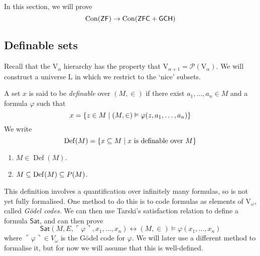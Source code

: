 In this section, we will prove
\[ \operatorname{Con}(\mathsf{ZF}) \to \operatorname{Con}(\mathsf{ZFC} + \mathsf{GCH}) \]

\subsection{Definable sets}
Recall that the \( \mathrm{V}_\alpha \) hierarchy has the property that \( \mathrm{V}_{\alpha + 1} = \mathcal P(\mathrm{V}_\alpha) \).
We will construct a universe \( \mathrm{L} \) in which we restrict to the `nice' subsets.
\begin{definition}
    A set \( x \) is said to be \emph{definable} over \( (M, \in) \) if there exist \( a_1, \dots, a_n \in M \) and a formula \( \varphi \) such that
    \[ x = \qty{z \in M \mid (M, \in) \vDash \varphi(z, a_1, \dots, a_n)} \]
    We write
    \[ \operatorname{Def}(M) = \qty{x \subseteq M \mid x \text{ is definable over } M} \]
\end{definition}
\begin{remark}
    \begin{enumerate}
        \item \( M \in \operatorname{Def}(M) \).
        \item \( M \subseteq \operatorname{Def}(M) \subseteq \mathcal \mathcal P(M) \).
    \end{enumerate}
\end{remark}
This definition involves a quantification over infinitely many formulas, so is not yet fully formalised.
One method to do this is to code formulas as elements of \( \mathrm{V}_\omega \), called \emph{G\"odel codes}.
We can then use Tarski's satisfaction relation to define a formula \( \mathsf{Sat} \), and can then prove
\[ \mathsf{Sat}(M, E, \ulcorner \varphi \urcorner, x_1, \dots, x_n) \leftrightarrow (M, \in) \vDash \varphi(x_1, \dots, x_n) \]
where \( \ulcorner \varphi \urcorner \in V_\omega \) is the G\"odel code for \( \varphi \).
We will later use a different method to formalise it, but for now we will assume that this is well-defined.

